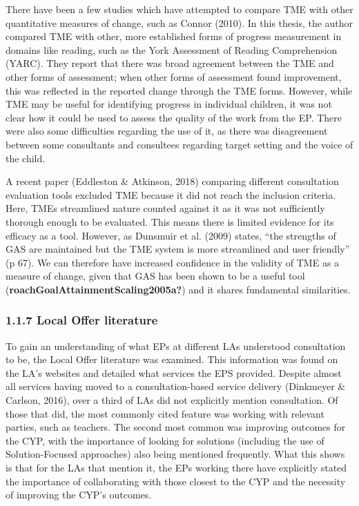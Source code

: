 \documentclass[
  english,
  man]{apa7}
\begin{document}
There have been a few studies which have attempted to compare TME with other quantitative measures of change, such as Connor (2010). In this thesis, the author compared TME with other, more established forms of progress measurement in domains like reading, such as the York Assessment of Reading Comprehension (YARC). They report that there was broad agreement between the TME and other forms of assessment; when other forms of assessment found improvement, this was reflected in the reported change through the TME forms. However, while TME may be useful for identifying progress in individual children, it was not clear how it could be used to assess the quality of the work from the EP. There were also some difficulties regarding the use of it, as there was disagreement between some consultants and consultees regarding target setting and the voice of the child.

A recent paper (Eddleston \& Atkinson, 2018) comparing different consultation evaluation tools excluded TME because it did not reach the inclusion criteria. Here, TMEs streamlined nature counted against it as it was not sufficiently thorough enough to be evaluated. This means there is limited evidence for its efficacy as a tool. However, as Dunsmuir et al. (2009) states, ``the strengths of GAS are maintained but the TME system is more streamlined and user friendly'' (p 67). We can therefore have increased confidence in the validity of TME as a measure of change, given that GAS has been shown to be a useful tool (\textbf{roachGoalAttainmentScaling2005a?}) and it shares fundamental similarities.

\hypertarget{local-offer-literature}{%
\subsubsection{1.1.7 Local Offer literature}\label{local-offer-literature}}

To gain an understanding of what EPs at different LAs understood consultation to be, the Local Offer literature was examined. This information was found on the LA's websites and detailed what services the EPS provided. Despite almost all services having moved to a consultation-based service delivery (Dinkmeyer \& Carlson, 2016), over a third of LAs did not explicitly mention consultation. Of those that did, the most commonly cited feature was working with relevant parties, such as teachers. The second most common was improving outcomes for the CYP, with the importance of looking for solutions (including the use of Solution-Focused approaches) also being mentioned frequently. What this shows is that for the LAs that mention it, the EPs working there have explicitly stated the importance of collaborating with those closest to the CYP and the necessity of improving the CYP's outcomes.
\end{document}
